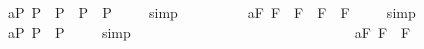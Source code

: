 \begin{isabellebody}
\ a{}{}{\isacharunderscore}{}{\isacharunderscore}P{\isacharcolon}\ {\isachardoublequoteopen}{\isacharbrackleft}{\isacharparenleft}\isactrlbold {\isasymbox}{\isacharparenleft}{\isasymphi}\isactrlsup P\ \isactrlbold {\isasymrightarrow}\ {\isasymphi}\isactrlsup P{\isacharparenright}{\isacharparenright}\ \isactrlbold {\isasymrightarrow}\ {\isacharparenleft}\isactrlbold {\isasymbox}{\isasymphi}\isactrlsup P\ \isactrlbold {\isasymrightarrow}\ \isactrlbold {\isasymbox}{\isasymphi}\isactrlsup P{\isacharparenright}{\isacharbrackright}\ {\isacharequal}\ {\isasymtop}{\isachardoublequoteclose}%
\isadelimproof
\ %
\endisadelimproof
%
\isatagproof
{}\isamarkupfalse%
\ simp\ \isamarkupfalse%
%
\endisatagproof
{\isafoldproof}%
%
\isadelimproof
%
\endisadelimproof
\ \ \ \ \ \isanewline
\ \isamarkupfalse%
\ a{}{}{\isacharunderscore}{}{\isacharunderscore}F{\isacharcolon}\ {\isachardoublequoteopen}{\isacharbrackleft}{\isacharparenleft}\isactrlbold {\isasymbox}{\isacharparenleft}{\isasymphi}\isactrlsup F\ \isactrlbold {\isasymrightarrow}\ {\isasymphi}\isactrlsup F{\isacharparenright}{\isacharparenright}\ \isactrlbold {\isasymrightarrow}\ {\isacharparenleft}\isactrlbold {\isasymbox}{\isasymphi}\isactrlsup F\ \isactrlbold {\isasymrightarrow}\ \isactrlbold {\isasymbox}{\isasymphi}\isactrlsup F{\isacharparenright}{\isacharbrackright}\ {\isacharequal}\ {\isasymtop}{\isachardoublequoteclose}%
\isadelimproof
\ %
\endisadelimproof
%
\isatagproof
{}\isamarkupfalse%
\ simp\ \isamarkupfalse%
%
\endisatagproof
{\isafoldproof}%
%
\isadelimproof
%
\endisadelimproof
\ \ \ \ \ \isanewline
\ \isamarkupfalse%
\ a{}{}{\isacharunderscore}{}{\isacharunderscore}P{\isacharcolon}\ {\isachardoublequoteopen}{\isacharbrackleft}\isactrlbold {\isasymbox}{\isasymphi}\isactrlsup P\ \isactrlbold {\isasymrightarrow}\ {\isasymphi}\isactrlsup P{\isacharbrackright}\ {\isacharequal}\ {\isasymtop}{\isachardoublequoteclose}%
\isadelimproof
\ %
\endisadelimproof
%
\isatagproof
{}\isamarkupfalse%
\ simp\ \isamarkupfalse%
%
\endisatagproof
{\isafoldproof}%
%
\isadelimproof
%
\endisadelimproof
\ \ \ \ \ \ \ \ \ \ \ \ \ \ \ \ \ \ \ \ \ \ \ \ \ \ \ \isanewline
\ \isamarkupfalse%
\ a{}{}{\isacharunderscore}{}{\isacharunderscore}F{\isacharcolon}\ {\isachardoublequoteopen}{\isacharbrackleft}\isactrlbold {\isasymbox}{\isasymphi}\isactrlsup F\ \isactrlbold {\isasymrightarrow}\ {\isasymphi}\isactrlsup F{\isacharbrackright}\ {\isacharequal}\ {\isasymtop}{\isachardoublequoteclose}%

\end{isabellebody}
